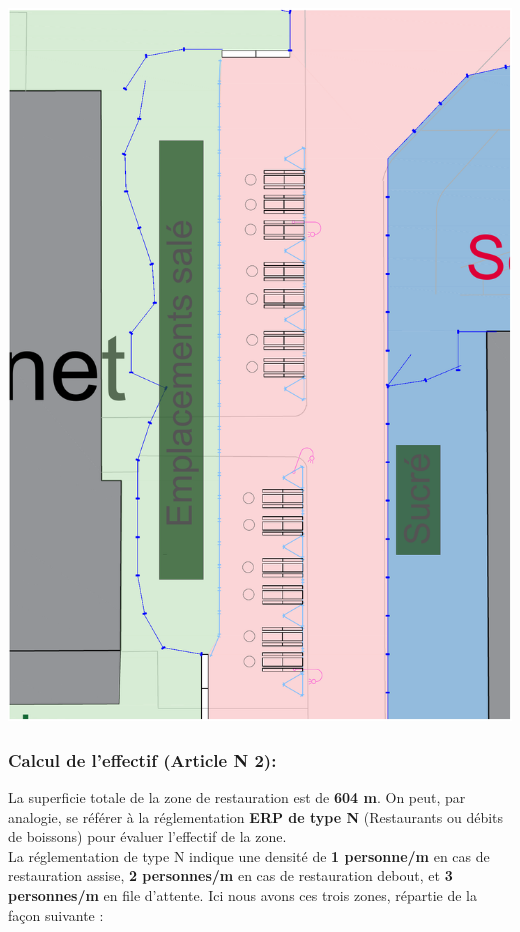 \documentclass[hidelinks, paper=a4, fontsize=13pt]{report}
\begin{document}
\begin{center}
	\includegraphics[scale=0.45]{Exports/Plan_24h_45eme-Espace_Resto_zoom}
\end{center}

\subsubsection{Calcul de l'effectif (Article N 2):}
La superficie totale de la zone de restauration est de \textbf{604 m}. On peut, par analogie, se référer à la réglementation \textbf{ERP de type N} (Restaurants ou débits de boissons) pour évaluer l’effectif de la zone. \\

La réglementation de type N indique une densité de \textbf{1 personne/m} en cas de restauration assise, \textbf{2 personnes/m} en cas de restauration debout, et \textbf{3 personnes/m} en file d'attente. Ici nous avons ces trois zones, répartie de la façon suivante :
\end{document}
